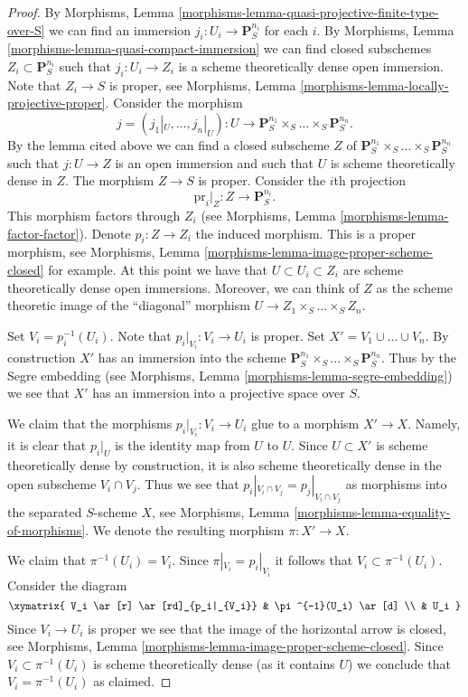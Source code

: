 \begin{proof}
\medskip\noindent
By Morphisms, Lemma \ref{morphisms-lemma-quasi-projective-finite-type-over-S}
we can find an immersion $j_i : U_i \to \mathbf{P}_S^{n_i}$
for each $i$. By
Morphisms, Lemma \ref{morphisms-lemma-quasi-compact-immersion} we can find
closed subschemes $Z_i \subset \mathbf{P}_S^{n_i}$
such that $j_i : U_i \to Z_i$ is a scheme theoretically
dense open immersion. Note that $Z_i \to S$ is proper, see
Morphisms, Lemma \ref{morphisms-lemma-locally-projective-proper}.
Consider the morphism
$$
j = (j_1|_U, \ldots, j_n|_U) : U \longrightarrow
\mathbf{P}_S^{n_1} \times_S \ldots \times_S \mathbf{P}_S^{n_n}.
$$
By the lemma cited above we can find a closed subscheme
$Z$ of $\mathbf{P}_S^{n_1} \times_S \ldots \times_S \mathbf{P}_S^{n_n}$
such that $j : U \to Z$ is an open immersion and such that $U$
is scheme theoretically dense in $Z$. The morphism $Z \to S$
is proper. Consider the $i$th projection
$$
\text{pr}_i|_Z : Z \longrightarrow \mathbf{P}^{n_i}_S.
$$
This morphism factors through $Z_i$ (see Morphisms,
Lemma \ref{morphisms-lemma-factor-factor}). Denote $p_i : Z \to Z_i$
the induced morphism. This is a proper morphism, see
Morphisms, Lemma \ref{morphisms-lemma-image-proper-scheme-closed}
for example. At this point we have that
$U \subset U_i \subset Z_i$ are scheme theoretically
dense open immersions. Moreover, we can think of $Z$ as the
scheme theoretic image of the ``diagonal'' morphism
$U \to Z_1 \times_S \ldots \times_S Z_n$.

\medskip\noindent
Set $V_i = p_i^{-1}(U_i)$. Note that $p_i|_{V_i} : V_i \to U_i$ is proper.
Set $X' = V_1 \cup \ldots \cup V_n$. By construction $X'$ has an immersion
into the scheme
$\mathbf{P}^{n_1}_S \times_S \ldots \times_S \mathbf{P}^{n_n}_S$.
Thus by the Segre embedding (see
Morphisms, Lemma \ref{morphisms-lemma-segre-embedding}) we see that $X'$ has
an immersion into a projective space over $S$.

\medskip\noindent
We claim that the morphisms $p_i|_{V_i}: V_i \to U_i$ glue to a morphism
$X' \to X$. Namely, it is clear that $p_i|_U$ is the identity map
from $U$ to $U$. Since $U \subset X'$ is scheme theoretically
dense by construction, it is also scheme theoretically dense
in the open subscheme $V_i \cap V_j$. Thus we see that
$p_i|_{V_i \cap V_j} = p_j|_{V_i \cap V_j}$ as morphisms into the
separated $S$-scheme $X$, see
Morphisms, Lemma \ref{morphisms-lemma-equality-of-morphisms}.
We denote the resulting morphism $\pi : X' \to X$.

\medskip\noindent
We claim that $\pi^{-1}(U_i) = V_i$.
Since $\pi|_{V_i} = p_i|_{V_i}$ it follows that
$V_i \subset \pi^{-1}(U_i)$. Consider the diagram
$$
\xymatrix{
V_i \ar[r] \ar[rd]_{p_i|_{V_i}} & \pi^{-1}(U_i) \ar[d] \\
& U_i
}
$$
Since $V_i \to U_i$ is proper we see that the image of
the horizontal arrow is closed, see
Morphisms, Lemma \ref{morphisms-lemma-image-proper-scheme-closed}.
Since $V_i \subset \pi^{-1}(U_i)$ is scheme
theoretically dense (as it contains $U$)
we conclude that $V_i = \pi^{-1}(U_i)$ as claimed.


\end{proof}
